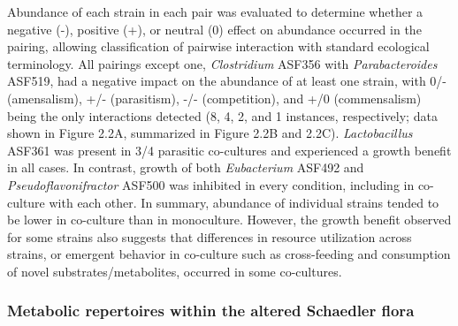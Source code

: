 \documentclass[11pt,twocolumn,notitlepage,openany,twoside]{book}
\begin{document}
\begin{refsection}
Abundance of each strain in each pair was evaluated to determine whether a negative (-), positive (+), or neutral (0) effect on abundance occurred in the pairing, allowing classification of pairwise interaction with standard ecological terminology. All pairings except one, \textit{Clostridium} ASF356 with \textit{Parabacteroides} ASF519, had a negative impact on the abundance of at least one strain, with 0/- (amensalism), +/- (parasitism), -/- (competition), and +/0 (commensalism) being the only interactions detected (8, 4, 2, and 1 instances, respectively; data shown in Figure 2.2A, summarized in Figure 2.2B and 2.2C). \textit{Lactobacillus} ASF361 was present in 3/4 parasitic co-cultures and experienced a growth benefit in all cases. In contrast, growth of both \textit{Eubacterium} ASF492 and \textit{Pseudoflavonifractor} ASF500 was inhibited in every condition, including in co-culture with each other. In summary, abundance of individual strains tended to be lower in co-culture than in monoculture. However, the growth benefit observed for some strains also suggests that differences in resource utilization across strains, or emergent behavior in co-culture such as cross-feeding and consumption of novel substrates/metabolites, occurred in some co-cultures.

\subsubsection{Metabolic repertoires within the altered Schaedler flora}


\end{refsection}
\end{document}

